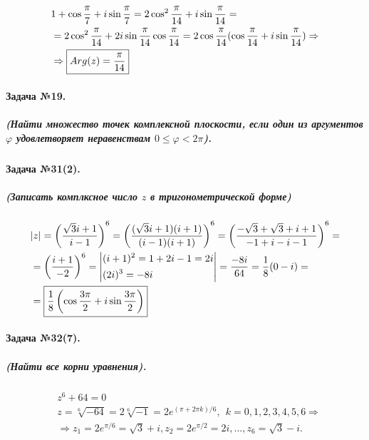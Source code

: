 \documentclass[a4paper,12pt]{report}
\begin{document}
\begin{align*}
	&1+\cos\dfrac{\pi}{7}+i\sin\dfrac{\pi}{7}=
	2\cos^2\dfrac{\pi}{14}+i\sin\dfrac{\pi}{14}=\\
	&=2\cos^2\dfrac{\pi}{14}+2i\sin\dfrac{\pi}{14}\cos\dfrac{\pi}{14}=
	2\cos\dfrac{\pi}{14}(\cos\dfrac{\pi}{14}+i\sin\dfrac{\pi}{14})
	\Rightarrow\\ 
	&\Rightarrow \fbox{$ Arg(z)=\dfrac{\pi}{14} $}
\end{align*}

\paragraph{Задача №19.}
\subparagraph{(Найти множество точек комплексной плоскости,
если один из аргументов $ \varphi $ удовлетворяет 
неравенствам $ 0\le\varphi<2\pi $).}

\paragraph{Задача №31(2).}
\subparagraph{(Записать комплксное число $ z $ в тригонометрической форме)}

\begin{align*}
	&|z|=\left(\dfrac{\sqrt{3}i+1}{i-1}\right)^6=
	\left(\dfrac{(\sqrt{3}i+1)(i+1)}{(i-1)(i+1)}\right)^6=
	\left(\dfrac{-\sqrt{3}+\sqrt{3}+i+1}{-1+i-i-1}\right)^6=\\
	&=\left(\dfrac{i+1}{-2}\right)^6=
	\left|
		\begin{aligned}
			&(i+1)^2=1+2i-1=2i\\
			&(2i)^3=-8i
		\end{aligned}
	\right|=
	\dfrac{-8i}{64}=\dfrac{1}{8}(0-i)=\\
	&=\fbox{$ \dfrac{1}{8}\left(\cos\dfrac{3\pi}{2}+i\sin\dfrac{3\pi}{2}\right) $}
\end{align*}

\paragraph{Задача №32(7).}
\subparagraph{(Найти все корни уравнения).}

\begin{align*}
	&z^6+64=0\\
	&z=\sqrt[6]{-64}=2\sqrt[6]{-1}=2e^{(\pi+2\pi k)/6},\ \ 
	k=0, 1, 2, 3, 4, 5, 6\Rightarrow\\
	&\Rightarrow z_1=2e^{\pi/6}=\sqrt{3}+i, 
	z_2=2e^{\pi/2}=2i,\ldots, z_6=\sqrt{3}-i.
\end{align*}
\end{document}
